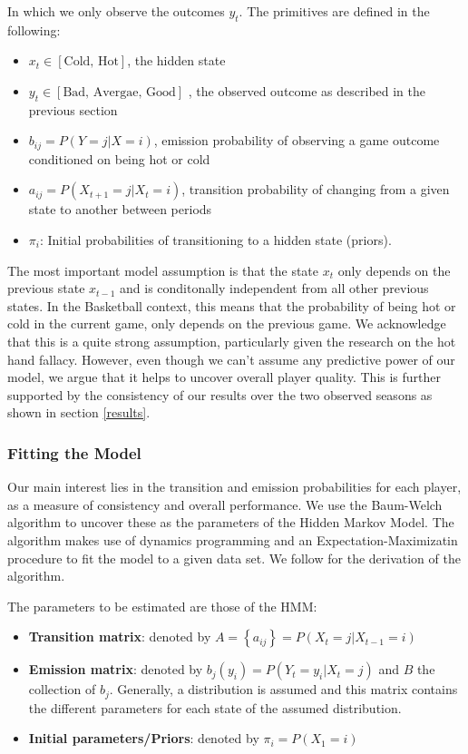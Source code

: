 \documentclass[12pt, authoryear]{elsarticle}
\begin{document}
In which we only observe the outcomes $y_t$. The primitives are defined in the following:

\begin{itemize}
	\item $x_t \in [\text{Cold, Hot}]$, the hidden state
	\item $y_t \in [\text{Bad, Avergae, Good}]$ , the observed outcome as described in the previous section
	\item $b_{ij} = P(Y = j | X = i)$, emission probability of observing a game outcome conditioned on being hot or cold
	\item $a_{ij} = P(X_{t+1} = j | X_t =i)$, transition probability of changing from a given state to another between periods
	\item $\pi_i$: Initial probabilities of transitioning to a hidden state (priors).
\end{itemize}

The most important model assumption is that the state $x_t$ only depends on the previous state $x_{t-1}$ and is conditonally independent from all other previous states. In the Basketball context, this means that the probability of being hot or cold in the current game, only depends on the previous game. We acknowledge that this is a quite strong assumption, particularly given the research on the hot hand fallacy. However, even though we can't assume any predictive power of our model, we argue that it helps to uncover overall player quality. This is further supported by the consistency of our results over the two observed seasons as shown in section \ref{results}.

\subsubsection{Fitting the Model}

Our main interest lies in the transition and emission probabilities for each player, as a measure of consistency and overall performance. We use the Baum-Welch algorithm to uncover these as the parameters of the Hidden Markov Model. The algorithm makes use of dynamics programming and an Expectation-Maximizatin procedure to fit the model to a given data set. We follow \cite{rabiner1989tutorial} for the derivation of the algorithm.

The parameters to be estimated are those of the HMM: 
\begin{itemize}
	\item \textbf{Transition matrix}: denoted by $A=\left\{a_{i j}\right\}=P\left(X_{t}=j | X_{t-1}=i\right)$
	\item \textbf{Emission matrix}: denoted by $b_{j}\left(y_{i}\right)=P\left(Y_{t}=y_{i} | X_{t}=j\right)$ and $B$ the collection of $b_{j}$. Generally, a distribution is assumed and this matrix contains the different parameters for each state of the assumed distribution. 
	\item \textbf{Initial parameters/Priors}: denoted by $\pi_{i}=P\left(X_{1}=i\right)$
\end{itemize}
\end{document}

